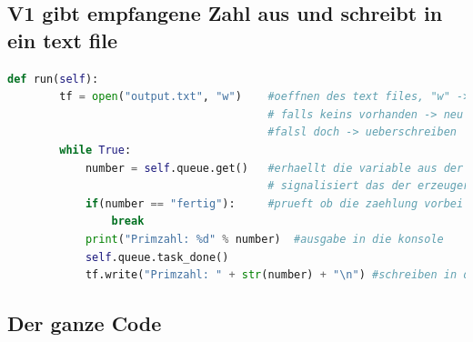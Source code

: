 \subsection{V1 gibt empfangene Zahl aus und schreibt in ein text file}

\begin{lstlisting}[language=python]
  def run(self):
        tf = open("output.txt", "w")    #oeffnen des text files, "w" ->
                                        # falls keins vorhanden -> neu erstellen
                                        #falsl doch -> ueberschreiben
        while True:
            number = self.queue.get()   #erhaellt die variable aus der queue und
                                        # signalisiert das der erzeuger weitermachen kann
            if(number == "fertig"):     #prueft ob die zaehlung vorbei ist
                break
            print("Primzahl: %d" % number)  #ausgabe in die konsole
            self.queue.task_done()
            tf.write("Primzahl: " + str(number) + "\n") #schreiben in das text file
\end{lstlisting}
\clearpage
\subsection{Der ganze Code}

